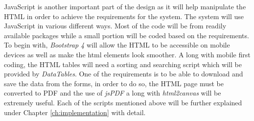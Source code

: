 \documentclass[../main.tex]{subfiles}
\begin{document}
\raggedright
JavaScript is another important part of the design as it will help manipulate the HTML in order to achieve the requirements for the system. The system will use JavaScript in various different ways. Most of the code will be from readily available packages while a small portion will be coded based on the requirements. To begin with, \textit{Bootstrap 4}\cite{bootstrapfour} will allow the HTML to be accessible on mobile devices as well as make the html elements look smoother. A long with mobile first coding, the HTML tables will need a sorting and searching script which will be provided by \textit{DataTables}\cite{datatables}. One of the requirements is to be able to download and save the data from the forms, in order to do so, the HTML page must be converted to PDF and the use of \textit{jsPDF}\cite{jsPDF} a long with \textit{html2canvas}\cite{htmlcanvas} will be extremely useful. Each of the scripts mentioned above will be further explained under Chapter \ref{ch:implementation} with detail.
\end{document}
